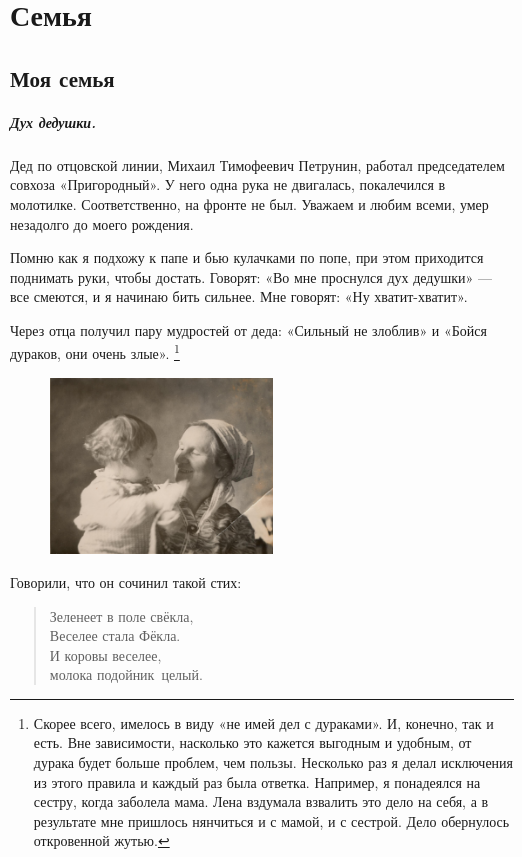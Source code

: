 \documentclass{book}
\begin{document}
\chapter*{Семья}

\section*{Моя семья}

\paragraph{Дух дедушки.}
Дед по отцовской линии, Михаил Тимофеевич Петрунин, работал председателем совхоза «Пригородный».
У него одна рука не двигалась, покалечился в молотилке.
Соответственно, на фронте не был. 
Уважаем и любим всеми, умер незадолго до моего рождения.

Помню как я подхожу к папе и бью кулачками по попе,
при этом приходится поднимать руки, чтобы достать.
Говорят: «Во мне проснулся дух дедушки» --- все смеются, и я начинаю бить сильнее.
Мне говорят: «Ну хватит-хватит».

Через отца получил пару мудростей от деда: «Сильный не злоблив» и «Бойся дураков, они очень злые».%
\footnote{Скорее всего, имелось в виду «не имей дел с дураками». 
И, конечно, так и есть.
Вне зависимости, насколько это кажется выгодным и удобным, от дурака будет больше проблем, чем пользы.
Несколько раз я делал исключения из этого правила и каждый раз была ответка.
Например, я понадеялся на сестру, когда заболела мама.
Лена вздумала взвалить это дело на себя, а в результате мне пришлось нянчиться и с мамой, и с сестрой.
Дело обернулось откровенной жутью.}

\begin{figure}
\vskip-4mm
\centering
\includegraphics[width=59mm,angle=0]{pics/lena-baba-zina}
\vskip-12mm
\end{figure}

Говорили, что он сочинил такой стих:
\begin{verse}
Зеленеет в поле \mbox{свёкла},
\\
\quad Веселее стала \mbox{Фёкла.}
\\
И коровы веселее,
\\
\quad молока \mbox{подойник целый.}
\end{verse}
\end{document}
